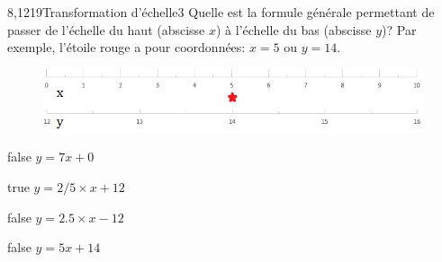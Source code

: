 			\begin{question}{8,1219}{Transformation d'échelle}{3}{}
				Quelle est la formule générale permettant de passer de l'échelle du haut (abscisse $x$) à l'échelle du bas (abscisse $y$)? Par exemple, l'étoile rouge a pour coordonnées: $x=5$ ou $y=\num{14}$.
				\begin{figure}
					\centering
    	            \includegraphics[scale=.75]{Antoine/Figures_Antoine/lin_0_10_to_lin_12_16_star_5_14.png}
				\end{figure}
			\end{question}
			\begin{reponses}
				\item[false] $y = 7x+0$
				\item[true] $y = 2/5\times x+12$
				\item[false] $y = \num{2.5}\times x-12$
				\item[false] $y = \num{5}x + 14$
			\end{reponses}
